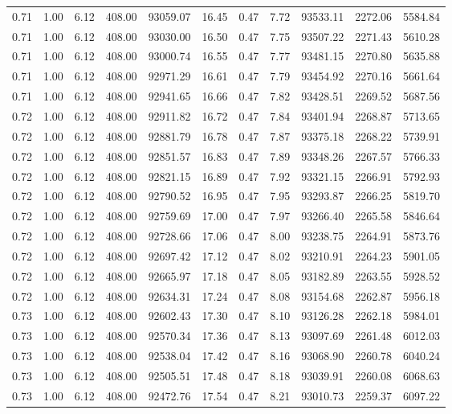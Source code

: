 \begin{table}[!ht]
\begin{tabular}{rrrrrrrrrrr}
0.71 & 1.00 & 6.12 & 408.00 & 93059.07 & 16.45 & 0.47 & 7.72 & 93533.11 & 2272.06 & 5584.84 \\
0.71 & 1.00 & 6.12 & 408.00 & 93030.00 & 16.50 & 0.47 & 7.75 & 93507.22 & 2271.43 & 5610.28 \\
0.71 & 1.00 & 6.12 & 408.00 & 93000.74 & 16.55 & 0.47 & 7.77 & 93481.15 & 2270.80 & 5635.88 \\
0.71 & 1.00 & 6.12 & 408.00 & 92971.29 & 16.61 & 0.47 & 7.79 & 93454.92 & 2270.16 & 5661.64 \\
0.71 & 1.00 & 6.12 & 408.00 & 92941.65 & 16.66 & 0.47 & 7.82 & 93428.51 & 2269.52 & 5687.56 \\
0.72 & 1.00 & 6.12 & 408.00 & 92911.82 & 16.72 & 0.47 & 7.84 & 93401.94 & 2268.87 & 5713.65 \\
0.72 & 1.00 & 6.12 & 408.00 & 92881.79 & 16.78 & 0.47 & 7.87 & 93375.18 & 2268.22 & 5739.91 \\
0.72 & 1.00 & 6.12 & 408.00 & 92851.57 & 16.83 & 0.47 & 7.89 & 93348.26 & 2267.57 & 5766.33 \\
0.72 & 1.00 & 6.12 & 408.00 & 92821.15 & 16.89 & 0.47 & 7.92 & 93321.15 & 2266.91 & 5792.93 \\
0.72 & 1.00 & 6.12 & 408.00 & 92790.52 & 16.95 & 0.47 & 7.95 & 93293.87 & 2266.25 & 5819.70 \\
0.72 & 1.00 & 6.12 & 408.00 & 92759.69 & 17.00 & 0.47 & 7.97 & 93266.40 & 2265.58 & 5846.64 \\
0.72 & 1.00 & 6.12 & 408.00 & 92728.66 & 17.06 & 0.47 & 8.00 & 93238.75 & 2264.91 & 5873.76 \\
0.72 & 1.00 & 6.12 & 408.00 & 92697.42 & 17.12 & 0.47 & 8.02 & 93210.91 & 2264.23 & 5901.05 \\
0.72 & 1.00 & 6.12 & 408.00 & 92665.97 & 17.18 & 0.47 & 8.05 & 93182.89 & 2263.55 & 5928.52 \\
0.72 & 1.00 & 6.12 & 408.00 & 92634.31 & 17.24 & 0.47 & 8.08 & 93154.68 & 2262.87 & 5956.18 \\
0.73 & 1.00 & 6.12 & 408.00 & 92602.43 & 17.30 & 0.47 & 8.10 & 93126.28 & 2262.18 & 5984.01 \\
0.73 & 1.00 & 6.12 & 408.00 & 92570.34 & 17.36 & 0.47 & 8.13 & 93097.69 & 2261.48 & 6012.03 \\
0.73 & 1.00 & 6.12 & 408.00 & 92538.04 & 17.42 & 0.47 & 8.16 & 93068.90 & 2260.78 & 6040.24 \\
0.73 & 1.00 & 6.12 & 408.00 & 92505.51 & 17.48 & 0.47 & 8.18 & 93039.91 & 2260.08 & 6068.63 \\
0.73 & 1.00 & 6.12 & 408.00 & 92472.76 & 17.54 & 0.47 & 8.21 & 93010.73 & 2259.37 & 6097.22 \\

\end{tabular}
\end{table}
